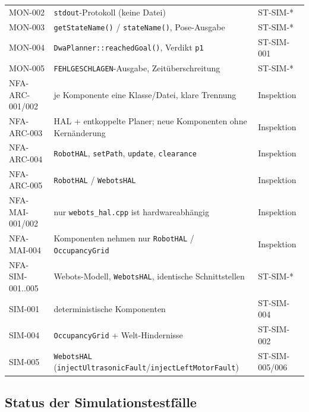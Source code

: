 \documentclass[
  a4paper,
  12pt,
  DIV=12,        %
  parskip=half,  %
  headings=small %
]{scrartcl}
\theoremstyle{definition}
\theoremstyle{definition}
\begin{document}
\begin{longtable}[]{@{}
  >{\raggedright\arraybackslash}p{}
  >{\raggedright\arraybackslash}p{}
  >{\raggedright\arraybackslash}p{}@{}}
MON-002 & \texttt{stdout}-Protokoll (keine Datei) & ST-SIM-*\\
MON-003 & \texttt{getStateName()} / \texttt{stateName()}, Pose-Ausgabe & ST-SIM-*\\
MON-004 & \texttt{DwaPlanner::reachedGoal()}, Verdikt \texttt{p1} & ST-SIM-001\\
MON-005 & \texttt{FEHLGESCHLAGEN}-Ausgabe, Zeitüberschreitung & ST-SIM-*\\
NFA-ARC-001/002 & je Komponente eine Klasse/Datei, klare Trennung & Inspektion\\
NFA-ARC-003 & HAL + entkoppelte Planer; neue Komponenten ohne Kernänderung & Inspektion\\
NFA-ARC-004 & \texttt{RobotHAL}, \texttt{setPath}, \texttt{update}, \texttt{clearance} & Inspektion\\
NFA-ARC-005 & \texttt{RobotHAL} / \texttt{WebotsHAL} & Inspektion\\
NFA-MAI-001/002 & nur \texttt{webots\_hal.cpp} ist hardwareabhängig & Inspektion\\
NFA-MAI-004 & Komponenten nehmen nur \texttt{RobotHAL} / \texttt{OccupancyGrid} & Inspektion\\
NFA-SIM-001..005 & Webots-Modell, \texttt{WebotsHAL}, identische Schnittstellen & ST-SIM-*\\
SIM-001 & deterministische Komponenten & ST-SIM-004\\
SIM-004 & \texttt{OccupancyGrid} + Welt-Hindernisse & ST-SIM-002\\
SIM-005 & \texttt{WebotsHAL} (\texttt{injectUltrasonicFault}/\texttt{injectLeftMotorFault}) & ST-SIM-005/006\\
\end{longtable}

\subsection{Status der Simulationstestfälle}\label{status-tests}
\end{document}

